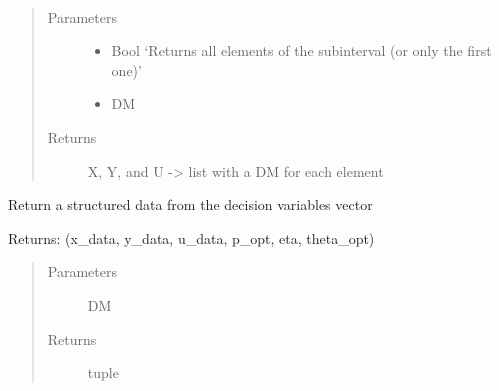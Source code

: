 \documentclass[letterpaper,10pt,english]{sphinxmanual}
\begin{document}
\begin{fulllineitems}
\begin{fulllineitems}
\label{\detokenize{yaocptool.methods.classic:yaocptool.methods.classic.multipleshooting.MultipleShootingScheme.split_x_y_and_u}}~\begin{quote}\begin{description}
\item[{Parameters}] \leavevmode\begin{itemize}
\item {} 
 \textendash{} Bool ‘Returns all elements of the subinterval (or only the first one)’

\item {} 
 \textendash{} DM

\end{itemize}

\item[{Returns}] \leavevmode
X, Y, and U -\textgreater{} list with a DM for each element

\end{description}\end{quote}

\end{fulllineitems}


\begin{fulllineitems}
\label{\detokenize{yaocptool.methods.classic:yaocptool.methods.classic.multipleshooting.MultipleShootingScheme.unpack_decision_variables}}
Return a structured data from the decision variables vector

Returns:
(x\_data, y\_data, u\_data, p\_opt, eta, theta\_opt)
\begin{quote}\begin{description}
\item[{Parameters}] \leavevmode
{} \textendash{} DM

\item[{Returns}] \leavevmode
tuple

\end{description}\end{quote}

\end{fulllineitems}


\end{fulllineitems}
\end{document}
